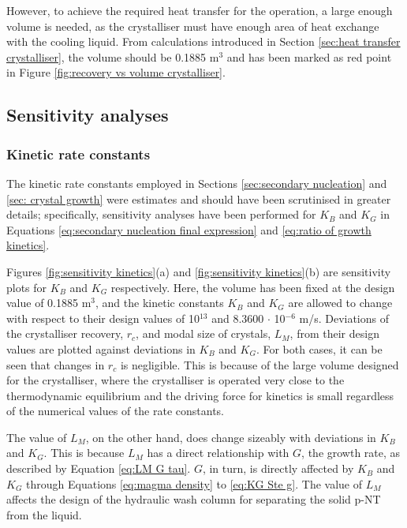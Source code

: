 However, to achieve the required heat transfer for the operation, a large enough volume is needed, as the crystalliser must have enough area of heat exchange with the cooling liquid. From calculations introduced in Section \ref{sec:heat transfer crystalliser}, the volume should be 0.1885 m$^3$ and has been marked as red point in Figure \ref{fig:recovery vs volume crystalliser}. 

\subsection{Sensitivity analyses}

\subsubsection{Kinetic rate constants}\label{sec:kinetics sensitivity}

The kinetic rate constants employed in Sections \ref{sec:secondary nucleation} and \ref{sec: crystal growth} were estimates and should have been scrutinised in greater details; specifically, sensitivity analyses have been performed for $K_B$ and $K_G$ in Equations \ref{eq:secondary nucleation final expression} and \ref{eq:ratio of growth kinetics}.

Figures \ref{fig:sensitivity kinetics}(a) and \ref{fig:sensitivity kinetics}(b) are sensitivity plots for $K_B$ and $K_G$ respectively. Here, the volume has been fixed at the design value of 0.1885 m$^3$, and the kinetic constants $K_B$ and $K_G$ are allowed to change with respect to their design values of 10$^{13}$ and 8.3600 $\cdot$ 10$^{-6}$ m/s. Deviations of the crystalliser recovery, $r_c$, and modal size of crystals, $L_M$, from their design values are plotted against deviations in $K_B$ and $K_G$. For both cases, it can be seen that changes in $r_c$ is negligible. This is because of the large volume designed for the crystalliser, where the crystalliser is operated very close to the thermodynamic equilibrium and the driving force for kinetics is small regardless of the numerical values of the rate constants.

The value of $L_M$, on the other hand, does change sizeably with deviations in $K_B$ and $K_G$. This is because $L_M$ has a direct relationship with $G$, the growth rate, as described by Equation \ref{eq:LM G tau}. $G$, in turn, is directly affected by $K_B$ and $K_G$ through Equations \ref{eq:magma density} to \ref{eq:KG Ste g}. The value of $L_M$ affects the design of the hydraulic wash column for separating the solid p-NT from the liquid. 

